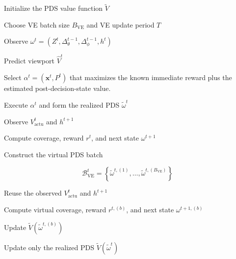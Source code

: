 \documentclass[10pt,conference,a4paper]{IEEEtran}
\begin{document}
\begin{algorithm}[H]
\caption{PDS + Virtual Experience Algorithm}
\label{alg:pds-ve}

\small

\begin{algorithmic}[1]
\setlength{\itemsep}{1pt}

\State Initialize the PDS value function $\widetilde V$

\State Choose VE batch size $B_{\mathrm{VE}}$ and VE update period $T$

\Statex \vspace{2pt}


    \State Observe
    $\omega^t=(Z^t,\Delta_\theta^{t-1},
    \Delta_\phi^{t-1},h^t)$

    \State Predict viewport $\widehat V^t$

    \State Select $\alpha^t=(\mathbf{x}^t,P^t)$ that maximizes
    the known immediate reward plus the estimated
    post-decision-state value.

    \State Execute $\alpha^t$ and form the realized PDS
    $\widetilde\omega^t$

    \State Observe $V_{\mathrm{actu}}^t$ and $h^{t+1}$

    \State Compute coverage, reward $r^t$, and next state
    $\omega^{t+1}$

    \Statex \vspace{2pt}


        \State Construct the virtual PDS batch

        \Statex
        \[
        \mathcal{B}_{\mathrm{VE}}^t
        =
        \left\{
        \widetilde\omega^{t,(1)},
        \ldots,
        \widetilde\omega^{t,(B_{\mathrm{VE}})}
        \right\}
        \]


            \State Reuse the observed $V_{\mathrm{actu}}^t$
            and $h^{t+1}$

            \State Compute virtual coverage, reward $r^{t,(b)}$,
            and next state $\omega^{t+1,(b)}$

            \State Update
            $\widetilde V(\widetilde\omega^{t,(b)})$

        \EndFor

    \Else

        \State Update only the realized PDS
        $\widetilde V(\widetilde\omega^t)$

    \EndIf

\EndFor

\end{algorithmic}
\end{algorithm}
\end{document}
